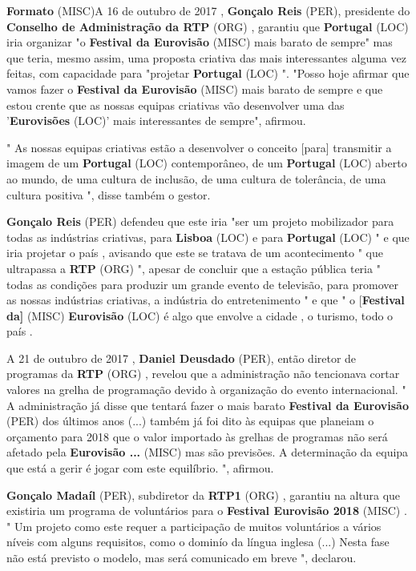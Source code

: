 \documentclass[12pt,a4paper]{article}
\begin{document}
\textbf{Formato} (MISC)A 16 de outubro de 2017 , \textbf{Gonçalo Reis} (PER), presidente do \textbf{Conselho de Administração da RTP} (ORG) , garantiu que \textbf{Portugal} (LOC) iria organizar "o \textbf{Festival da Eurovisão} (MISC) mais barato de sempre" mas que teria, mesmo assim, uma proposta criativa das mais interessantes alguma vez feitas, com capacidade para "projetar \textbf{Portugal} (LOC) ". "Posso hoje afirmar que vamos fazer o \textbf{Festival da Eurovisão} (MISC) mais barato de sempre e que estou crente que as nossas equipas criativas vão desenvolver uma das '\textbf{Eurovisões} (LOC)' mais interessantes de sempre", afirmou.

" As nossas equipas criativas estão a desenvolver o conceito [para] transmitir a imagem de um \textbf{Portugal} (LOC) contemporâneo, de um \textbf{Portugal} (LOC) aberto ao mundo, de uma cultura de inclusão, de uma cultura de tolerância, de uma cultura positiva ", disse também o gestor.

\textbf{Gonçalo Reis} (PER) defendeu que este iria "ser um projeto mobilizador para todas as indústrias criativas, para \textbf{Lisboa} (LOC) e para \textbf{Portugal} (LOC) " e que iria projetar o país , avisando que este se tratava de um acontecimento " que ultrapassa a \textbf{RTP} (ORG) ", apesar de concluir que a estação pública teria " todas as condições para produzir um grande evento de televisão, para promover as nossas indústrias criativas, a indústria do entretenimento " e que " o [\textbf{Festival da]} (MISC) \textbf{Eurovisão} (LOC) é algo que envolve a cidade , o turismo, todo o país .

A 21 de outubro de 2017 , \textbf{Daniel Deusdado} (PER), então diretor de programas da \textbf{RTP} (ORG) , revelou que a administração não tencionava cortar valores na grelha de programação devido à organização do evento internacional. " A administração já disse que tentará fazer o mais barato \textbf{Festival da Eurovisão} (PER) dos últimos anos (...) também já foi dito às equipas que planeiam o orçamento para 2018 que o valor importado às grelhas de programas não será afetado pela \textbf{Eurovisão ...} (MISC) mas são previsões. A determinação da equipa que está a gerir é jogar com este equilíbrio. ", afirmou.

\textbf{Gonçalo Madaíl} (PER), subdiretor da \textbf{RTP1} (ORG) , garantiu na altura que existiria um programa de voluntários para o \textbf{Festival Eurovisão 2018} (MISC) . " Um projeto como este requer a participação de muitos voluntários a vários níveis com alguns requisitos, como o dominío da língua inglesa (...) Nesta fase não está previsto o modelo, mas será comunicado em breve ", declarou.
\end{document}
